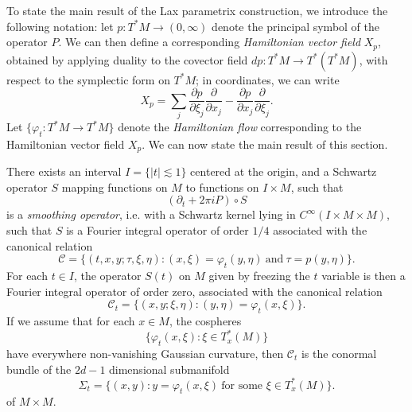 To state the main result of the Lax parametrix construction, we introduce the following notation: let $p: T^* M \to (0,\infty)$ denote the principal symbol of the operator $P$. We can then define a corresponding \emph{Hamiltonian vector field} $X_p$, obtained by applying duality to the covector field $dp: T^*M \to T^*(T^*M)$, with respect to the symplectic form on $T^* M$; in coordinates, we can write
%
\[ X_p = \sum_j \frac{\partial p}{\partial \xi_j} \frac{\partial}{\partial x_j} - \frac{\partial p}{\partial x_j} \frac{\partial}{\partial \xi_j}. \]
%
Let $\{ \varphi_t : T^* M \to T^* M \}$ denote the \emph{Hamiltonian flow} corresponding to the Hamiltonian vector field $X_p$. We can now state the main result of this section.

\begin{theorem}
    There exists an interval $I = \{ |t| \lesssim 1 \}$ centered at the origin, and a Schwartz operator $S$ mapping functions on $M$ to functions on $I \times M$, such that
    \[ (\partial_t + 2 \pi i P) \circ S \]
    is a \emph{smoothing operator}, i.e. with a Schwartz kernel lying in $C^\infty(I \times M \times M)$, such that $S$ is a Fourier integral operator of order $1/4$ associated with the canonical relation
    \[ \mathcal{C} = \{ (t,x,y;\tau,\xi,\eta) : (x,\xi) = \varphi_t(y,\eta)\ \text{and}\ \tau = p(y,\eta) \}. \]
    For each $t \in I$, the operator $S(t)$ on $M$ given by freezing the $t$ variable is then a Fourier integral operator of order zero, associated with the canonical relation
    \[ \mathcal{C}_t = \{ (x,y;\xi,\eta) : (y,\eta) = \varphi_t(x,\xi) \}. \]
    If we assume that for each $x \in M$, the cospheres
    \[ \{ \varphi_t(x,\xi) : \xi \in T^*_x(M) \} \]
    have everywhere non-vanishing Gaussian curvature, then $\mathcal{C}_t$ is the conormal bundle of the $2d-1$ dimensional submanifold
    \[ \Sigma_t = \{ (x,y): y = \varphi_t(x,\xi)\ \text{for some $\xi \in T^*_x(M)$} \}. \]
    of $M \times M$.
\end{theorem}




